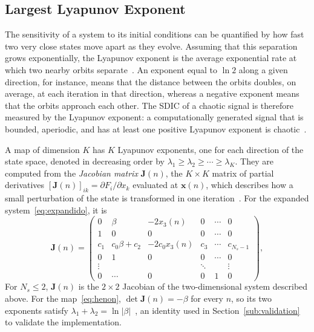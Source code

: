 \documentclass[journal]{IEEEtran}
\begin{document}
\subsection{Largest Lyapunov Exponent}\label{sub:lyap}
The sensitivity of a system to its initial conditions can be quantified by
how fast two very close states move apart as they evolve. Assuming that this
separation grows exponentially, the Lyapunov exponent is the average
exponential rate at which two nearby orbits separate~\cite{Alligood1996,Borges2022sbrt}. An
exponent equal to $\ln2$ along a given direction, for instance, means that the
distance between the orbits doubles, on average, at each iteration in that
direction, whereas a negative exponent means that the orbits approach each
other. The SDIC of a chaotic signal is therefore measured by the Lyapunov
exponent: a computationally generated signal that is bounded, aperiodic, and
has at least one positive Lyapunov exponent is chaotic~\cite{Alligood1996}.

A map of dimension $K$ has $K$ Lyapunov exponents, one for each direction of
the state space, denoted in decreasing order by
$\lambda_1\ge\lambda_2\ge\cdots\ge\lambda_K$. They are computed from the
\emph{Jacobian matrix} $\mathbf{J}(n)$, the $K\times K$ matrix of partial
derivatives $[\mathbf{J}(n)]_{ik}=\partial F_i/\partial x_k$ evaluated at
$\mathbf{x}(n)$, which describes how a small perturbation of the state is
transformed in one iteration~\cite{Alligood1996}. For the expanded
system~\eqref{eq:expandido}, it is~\cite{Borges2022sbrt,BorgesCNSNS2024}
\begin{equation}
  \mathbf{J}(n) = \begin{pmatrix}
    0 & \beta & -2x_3(n) & 0 & \cdots & 0 \\
    1 & 0 & 0 & 0 & \cdots & 0 \\
    c_1 & c_0\beta + c_2 & -2c_0 x_3(n) & c_3 & \cdots & c_{N_s-1} \\
    0 & 1 & 0 & 0 & \cdots & 0 \\
    \vdots & & & \ddots & & \vdots \\
    0 & \cdots & 0 & 0 & 1 & 0
  \end{pmatrix},
  \label{eq:jacobiana}
\end{equation}
For $N_s \le 2$, $\mathbf{J}(n)$ is the $2 \times 2$ Jacobian of the two-dimensional
system described above. For the map~\eqref{eq:henon}, $\det\mathbf{J}(n)=-\beta$
for every $n$, so its two exponents satisfy
$\lambda_1+\lambda_2=\ln|\beta|$~\cite{Alligood1996}, an identity used in
Section~\ref{sub:validation} to validate the implementation.
\end{document}
